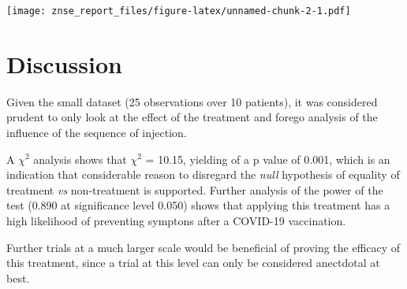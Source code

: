 \documentclass[
]{article}
\newenvironment{Shaded}{\begin{snugshade}}{\end{snugshade}}
\newcommand{\AttributeTok}[1]{\textcolor[rgb]{0.77,0.63,0.00}{#1}}
\newcommand{\FunctionTok}[1]{\textcolor[rgb]{0.00,0.00,0.00}{#1}}
\newcommand{\NormalTok}[1]{#1}
\newcommand{\OtherTok}[1]{\textcolor[rgb]{0.56,0.35,0.01}{#1}}
\newcommand{\SpecialCharTok}[1]{\textcolor[rgb]{0.00,0.00,0.00}{#1}}
\begin{document}
\texttt{[image: znse\_report\_files/figure-latex/unnamed-chunk-2-1.pdf]}

\hypertarget{discussion}{%
\section{Discussion}\label{discussion}}

Given the small dataset (25 observations over 10 patients), it was
considered prudent to only look at the effect of the treatment and
forego analysis of the influence of the sequence of injection.

\begin{Shaded}
\end{Shaded}

A \(\chi^2\) analysis shows that \(\chi^2\) = 10.15, yielding of a p
value of 0.001, which is an indication that considerable reason to
disregard the \emph{null} hypothesis of equality of treatment \emph{vs}
non-treatment is supported. Further analysis of the power of the test
(0.890 at significance level 0.050) shows that applying this treatment
has a high likelihood of preventing symptons after a COVID-19
vaccination.

Further trials at a much larger scale would be beneficial of proving the
efficacy of this treatment, since a trial at this level can only be
considered anectdotal at best.
\end{document}
